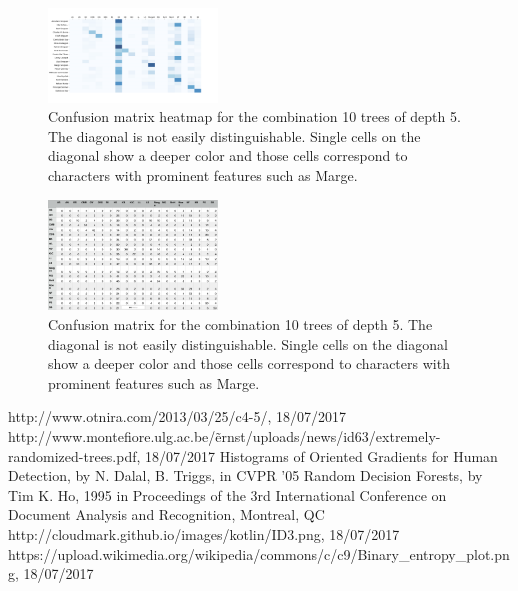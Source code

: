 \documentclass[journal, a4paper]{IEEEtran}
\begin{document}
\newpage
\begin{figure}[!ht]
	\centering
  \includegraphics[width=0.4\textwidth]{15x5.png}
	\caption{Confusion matrix heatmap for the combination 10 trees of depth 5. The diagonal is not easily distinguishable. Single cells on the diagonal show a deeper color and those cells correspond to characters with prominent features such as Marge.}
	\label{fig4}
\end{figure}
\begin{figure}[!ht]
	\centering
  \includegraphics[width=0.4\textwidth]{15x5table.png}
	\caption{Confusion matrix for the combination 10 trees of depth 5. The diagonal is not easily distinguishable. Single cells on the diagonal show a deeper color and those cells correspond to characters with prominent features such as Marge.}
	\label{fig45}
\end{figure}


\begin{thebibliography}{5}

    http://www.otnira.com/2013/03/25/c4-5/, 18/07/2017
    http://www.montefiore.ulg.ac.be/\~ernst/uploads/news/id63/extremely-randomized-trees.pdf, 18/07/2017
    Histograms of Oriented Gradients for Human Detection, by N. Dalal, B. 		Triggs, in CVPR '05
    Random Decision Forests, by Tim K. Ho, 1995 in Proceedings of the 3rd International Conference on Document Analysis and Recognition, Montreal, QC
    http://cloudmark.github.io/images/kotlin/ID3.png, 18/07/2017
    				https://upload.wikimedia.org/wikipedia/commons/c/c9/Binary\_entropy\_plot.png, 18/07/2017
    
\end{thebibliography}

\end{document}
